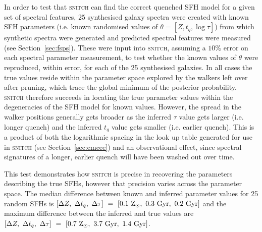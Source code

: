 \documentclass[useAMS,usenatbib]{mn2e}
\begin{document}
In order to test that \textsc{snitch} can find the correct quenched SFH model for a given set of spectral features, 25 synthesised galaxy spectra were created with known SFH parameters (i.e. known randomised values of $\theta = [Z, t_q, \log \tau]$) from which synthetic spectra were generated and predicted spectral features were measured (see Section~\ref{sec:fsps}). These were input into \textsc{snitch}, assuming a $10\%$ error on each spectral parameter measurement, to test whether the known values of $\theta$ were reproduced, within error, for each of the 25 synthesised galaxies. %
In all cases the true values reside within the parameter space explored by the walkers left over after pruning, which trace the global minimum of the posterior probability. \textsc{snitch} therefore succeeds in locating the true parameter values within the degeneracies of the SFH model for known values. However, the spread in the walker positions generally gets broader as the inferred $\tau$ value gets larger (i.e. longer quench) and the inferred $t_q$ value gets smaller (i.e. earlier quench). This is a product of both the logarithmic spacing in the look up table generated for use in \textsc{snitch} (see Section~\ref{sec:emcee}) and an observational effect, since spectral signatures of a longer, earlier quench will have been washed out over time. 

This test demonstrates how \textsc{snitch} is precise in recovering the parameters describing the true SFHs, however that precision varies across the parameter space. The median difference between known and inferred parameter values for 25 random SFHs is $[\Delta Z,~\Delta t_q,~\Delta \tau]~=~[0.1~\rm{Z}_{\odot},~0.3~\rm{Gyr},~0.2~\rm{Gyr}]$ and the maximum difference between the inferred and true values are $[\Delta Z,~\Delta t_q,~\Delta \tau]~=~[0.7~\rm{Z}_{\odot},~3.7~\rm{Gyr},~1.4~\rm{Gyr}]$.
\end{document}
